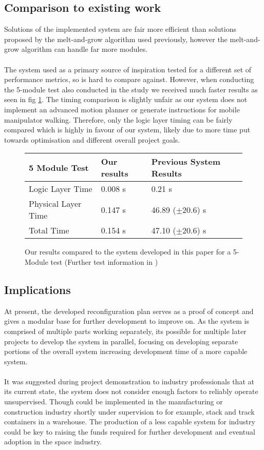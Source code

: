 \subsection{Comparison to existing work}
Solutions of the implemented system are fair more efficient than solutions proposed by the melt-and-grow algorithm \cite{8581406} used previously, however the melt-and-grow algorithm can handle far more modules. 
\\\\
The system used as a primary source of inspiration \cite{9438257} tested for a different set of performance metrics, so is hard to compare against. However, when conducting the 5-module test also conducted in the study we received much faster results as seen in fig \ref{resultCompare}. The timing comparison is slightly unfair as our system does not implement an advanced motion planner or generate instructions for mobile manipulator walking. Therefore, only the logic layer timing can be fairly compared which is highly in favour of our system, likely due to more time put towards optimisation and different overall project goals.

\begin{figure}[H]
	\begin{tabularx}{\textwidth} {| X | p{} | p{} |}
		\hline
		\textbf{5 Module Test} & \textbf{Our results} & \textbf{Previous System Results}\\
		\hline
		Logic Layer Time 	 & 0.008 s	& 0.21 s\\
		\hline
		Physical Layer Time   & 0.147 s & 46.89 ($\pm$20.6) s\\
		\hline
		Total Time 	 & 0.154 s & 47.10 ($\pm$20.6) s \\
		\hline
	\end{tabularx}
	\caption{Our results compared to the system developed in this paper \cite{9438257} for a 5-Module test (Further test information in )}
	\label{resultCompare}
\end{figure}

\subsection{Implications}
At present, the developed reconfiguration plan serves as a proof of concept and gives a modular base for further development to improve on. As the system is comprised of multiple parts working separately, its possible for multiple later projects to develop the system in parallel, focusing on developing separate portions of the overall system increasing development time of a more capable system.
\\\\
It was suggested during project demonstration to industry professionals that at its current state, the system does not consider enough factors to reliably operate unsupervised. Though could be implemented in the manufacturing or construction industry shortly under supervision to for example, stack and track containers in a warehouse. The production of a less capable system for industry could be key to raising the funds required for further development and eventual adoption in the space industry.
